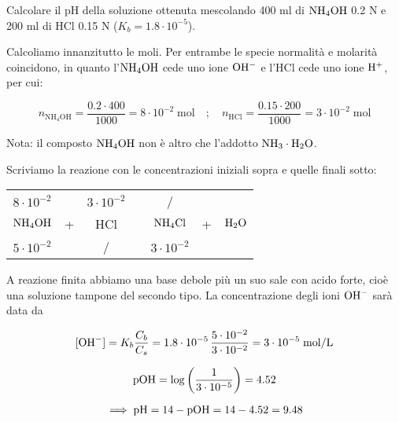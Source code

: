 \newpage

\begin{esercizio}
    Calcolare il pH della soluzione ottenuta mescolando 400 ml di $\rm NH_4OH$ 0.2 N e 200 ml di HCl 0.15 N ($K_b = 1.8 \cdot 10^{-5}$).
\end{esercizio}
\begin{soluzione}
    Calcoliamo innanzitutto le moli. Per entrambe le specie normalità e molarità coincidono, in quanto l'$\rm NH_4OH$ cede uno ione $\rm OH^-$ e l'HCl cede uno ione $\rm H^+$, per cui:

$$n_{\text{NH}_4\text{OH}}=\frac{0.2 \cdot 400}{1000}=8 \cdot 10^{-2} \; \text{mol}
\quad ; \quad
n_{\text{HCl}}=\frac{0.15 \cdot 200}{1000}=3 \cdot 10^{-2} \; \text{mol}$$

Nota: il composto $\rm NH_4OH$ non è altro che l'addotto $\rm NH_3 \cdot H_2O$.

Scriviamo la reazione con le concentrazioni iniziali sopra e quelle finali sotto:

\begin{center}
    \begin{tabular}{ccccccc}
        $8 \cdot 10^{-2}$ &  & $3 \cdot 10^{-2}$ & & / &&\\
        $\rm NH_4OH$ & + & HCl & \ce{->} & $\rm NH_4Cl$ & + & $\rm H_2O$\\
        $5 \cdot 10^{-2}$ &  &  / & & $3 \cdot 10^{-2}$&&\\
    \end{tabular}
\end{center}

A reazione finita abbiamo una base debole più un suo sale con acido forte, cioè una soluzione tampone del secondo tipo. La concentrazione degli ioni $\rm OH^-$ sarà data da

$$[\text{OH}^-]=K_b\frac{C_b}{C_s}
=1.8 \cdot 10^{-5}\,\frac{5 \cdot 10^{-2}}{3 \cdot 10^{-2}}
= 3 \cdot 10^{-5} \; \rm mol/L$$

$$\rm pOH=\log\left(\frac{1}{3 \cdot 10^{-5}}\right)=4.52$$

$$\implies \rm pH=14-pOH=14-4.52=9.48$$
\end{soluzione}

\newpage

